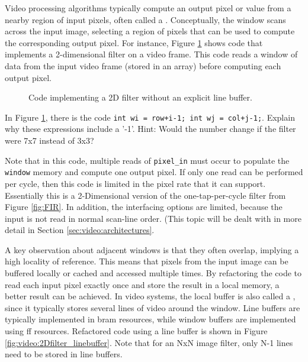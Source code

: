 Video processing algorithms typically compute an output pixel or value from a nearby region of input pixels, often called a .   Conceptually, the window scans across the input image, selecting a region of pixels that can be used to compute the corresponding output pixel.  For instance, Figure \ref{fig:video:2Dfilter} shows code that implements a 2-dimensional filter on a video frame.  This code reads a window of data from the input video frame (stored in an array) before computing each output pixel.  

\begin{figure}

\caption{Code implementing a 2D filter without an explicit line buffer.}\label{fig:video:2Dfilter}
\end{figure}

\begin{exercise}
In Figure \ref{fig:video:2Dfilter}, there is the code \lstinline{int wi = row+i-1; int wj = col+j-1;}.  Explain why these expressions include a '-1'.  Hint: Would the number change if the filter were 7x7 instead of 3x3?
\end{exercise}

Note that in this code, multiple reads of \lstinline|pixel_in| must occur to populate the \lstinline|window| memory and compute one output pixel.  If only one read can be performed per cycle, then this code is limited in the pixel rate that it can support.  Essentially this is a 2-Dimensional version of the one-tap-per-cycle filter from Figure \ref{fig:FIR}.  In addition, the interfacing options are limited, because the input is not read in normal scan-line order.  (This topic will be dealt with in more detail in Section \ref{sec:video:architectures}.

A key observation about adjacent windows is that they often overlap, implying a high locality of reference.  This means that pixels from the input image can be buffered locally or cached and accessed multiple times.  By refactoring the code to read each input pixel exactly once and store the result in a local memory, a better result can be achieved.  In video systems, the local buffer is also called a , since it typically stores several lines of video around the window.   Line buffers are typically implemented in \gls{bram} resources, while window buffers are implemented using \gls{ff} resources.  Refactored code using a line buffer is shown in Figure \ref{fig:video:2Dfilter_linebuffer}.
Note that for an NxN image filter, only N-1 lines need to be stored in line buffers.  

